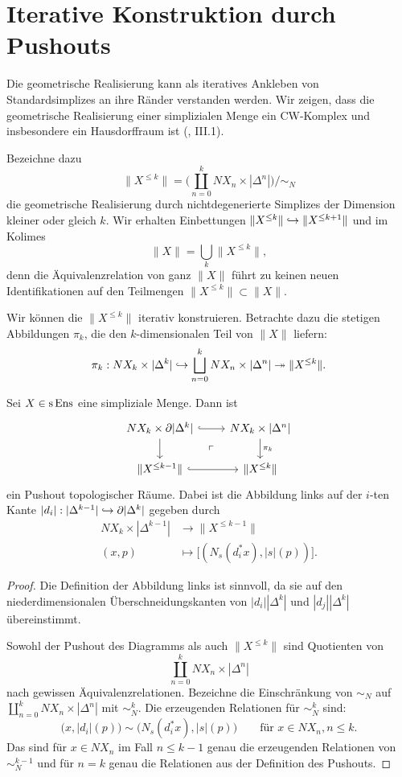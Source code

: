 \section{Iterative Konstruktion durch Pushouts}

Die geometrische Realisierung kann als iteratives Ankleben von
Standardsimplizes an ihre Ränder verstanden werden. Wir zeigen, dass
die geometrische Realisierung einer simplizialen Menge ein CW-Komplex
und insbesondere ein Hausdorffraum ist (\cite{Moer}, III.1).

Bezeichne dazu
\[ \|X^{\leq k}\| =
\bigg( \coprod_{n = 0}^k NX_n \times |\Delta^n| \bigg) \big/ \sim_N \]
die geometrische Realisierung durch nichtdegenerierte Simplizes der
Dimension kleiner oder gleich $k$. Wir erhalten Einbettungen
$\|X^{\leq k}\| \hookrightarrow \|X^{\leq k+1}\|$ und im Kolimes
\[ \|X\| = \bigcup_k \|X^{\leq k}\|, \]
denn die Äquivalenzrelation von ganz $\|X\|$ führt zu keinen neuen
Identifikationen auf den Teilmengen $\|X^{\leq k}\| \subset \|X\|$.

Wir können die $\|X^{\leq k}\|$ iterativ konstruieren. Betrachte dazu
die stetigen Abbildungen $\pi_k$, die den $k$-dimensionalen Teil von
$\|X\|$ liefern:
\[ \pi_k: NX_k \times |\Delta^k|
  \hookrightarrow \bigsqcup_{n=0}^k NX_n \times |\Delta^n|
  \twoheadrightarrow \|X^{\leq k}\|. \]

\begin{prop}
  Sei $X \in \operatorname{s}\operatorname{Ens}$ eine simpliziale Menge. Dann ist
  \[ \begin{tikzcd}
    NX_k \times \del |\Delta^k| \arrow[r, hook] \arrow[d]
    \arrow[dr, phantom, "\ulcorner"]
    & NX_k \times |\Delta^n| \arrow[d, "\pi_k"] \\
    \|X^{\leq k-1}\| \arrow[r, hook]
    & \|X^{\leq k}\|
  \end{tikzcd} \]
  ein Pushout topologischer Räume. Dabei ist die Abbildung links auf
  der $i$-ten Kante $|d_i|: |\Delta^{k-1}| \hookrightarrow \partial |\Delta^k|$
  gegeben durch
  \begin{align*}
    NX_k \times |\Delta^{k-1}| &\to \|X^{\leq k-1}\| \\
    (x, p) &\mapsto \big[ (N_s(d_i^* x), |s|(p)) \big].
  \end{align*}
\end{prop}
\begin{proof}
  Die Definition der Abbildung links ist sinnvoll, da sie auf den
  niederdimensionalen Überschneidungskanten von $|d_i| |\Delta^k|$ und
  $|d_j| |\Delta^k|$ übereinstimmt.
  
  Sowohl der Pushout des Diagramms als auch $\|X^{\leq k}\|$ sind
  Quotienten von
  \[\coprod_{n=0}^k NX_n \times |\Delta^n| \]
  nach gewissen Äquivalenzrelationen. Bezeichne die Einschränkung von
  $\sim_N$ auf $\coprod_{n=0}^k NX_n \times |\Delta^n|$ mit
  $\sim_N^k$. Die erzeugenden Relationen für $\sim_N^k$ sind:
  \[ \big( x, |d_i|(p) \big) \sim \big( N_s(d_i^* x), |s|(p) \big)
  \qquad \text{für } x \in NX_n, n \leq k.
  \]
  Das sind für $x \in NX_n$ im Fall $n \leq k-1$ genau die erzeugenden
  Relationen von $\sim_N^{k-1}$ und für $n = k$ genau die Relationen
  aus der Definition des Pushouts.
\end{proof}

